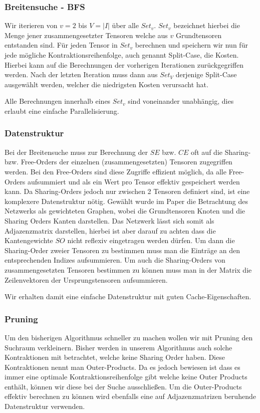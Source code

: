\documentclass{article}
\begin{document}
\subsubsection*{Breitensuche - BFS}

Wir iterieren von $v=2$ bis $V=|I|$ über alle $Set_v$.
$Set_v$ bezeichnet hierbei die Menge jener zusammengesetzter Tensoren welche aus $v$ Grundtensoren entstanden sind. Für jeden Tensor in $Set_v$ berechnen und speichern wir nun für jede mögliche Kontraktionsreihenfolge, auch genannt Split-Case, die Kosten. Hierbei kann auf die Berechnungen der vorherigen Iterationen zurückgegriffen werden. Nach der letzten Iteration muss dann aus $Set_V$ derjenige Split-Case ausgewählt werden, welcher die niedrigsten Kosten verursacht hat.

Alle Berechnungen innerhalb eines $Set_v$ sind voneinander unabhängig, dies erlaubt eine einfache Parallelisierung.

\subsubsection*{Datenstruktur}

Bei der Breitensuche muss zur Berechnung der $SE$ bzw. $CE$ oft auf die Sharing- bzw. Free-Orders der einzelnen (zusammengesetzten) Tensoren zugegriffen werden. Bei den Free-Orders sind diese Zugriffe effizient möglich, da alle Free-Orders aufsummiert und als ein Wert pro Tensor effektiv gespeichert werden kann. Da Sharing-Orders jedoch nur zwischen 2 Tensoren definiert sind, ist eine komplexere Datenstruktur nötig.
Gewählt wurde im Paper die Betrachtung des Netzwerks als gewichteten Graphen, wobei die Grundtensoren Knoten und die Sharing Orders Kanten darstellen. Das Netzwerk lässt sich somit als Adjazenzmatrix darstellen, hierbei ist aber darauf zu achten dass die Kantengewichte $SO$ nicht reflexiv eingetragen werden dürfen. Um dann die Sharing-Order zweier Tensoren zu bestimmen muss man die Einträge an den entsprechenden Indizes aufsummieren. 
Um auch die Sharing-Orders von zusammengesetzten Tensoren bestimmen zu können muss man in der Matrix die Zeilenvektoren der Ursprungstensoren aufsummieren.

Wir erhalten damit eine einfache Datenstruktur mit guten Cache-Eigenschaften.

\subsubsection*{Pruning}

Um den bisherigen Algorithmus schneller zu machen wollen wir mit Pruning den Suchraum verkleinern.
Bisher werden in unserem Algorithmus auch solche Kontraktionen mit betrachtet, welche keine Sharing Order haben. Diese Kontraktionen nennt man Outer-Products. Da es jedoch bewiesen ist dass es immer eine optimale Kontraktionsreihenfolge gibt welche keine Outer Products enthält, können wir diese bei der Suche ausschließen. 
Um die Outer-Products effektiv berechnen zu können wird ebenfalls eine auf Adjazenzmatrizen beruhende Datenstruktur verwenden.
\end{document}
